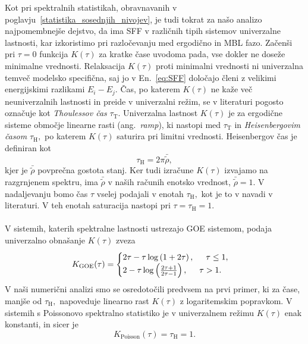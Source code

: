 Kot pri spektralnih statistikah, obravnavanih v poglavju~\ref{statistika_sosednjih_nivojev}, je tudi tokrat za našo analizo najpomembnejše dejstvo, da ima SFF v različnih tipih sistemov univerzalne lastnosti, kar izkoristimo pri razločevanju med ergodično in MBL fazo. Začenši pri $\tau=0$ funkcija $K(\tau)$ za kratke čase uvodoma pada, vse dokler ne doseže minimalne vrednosti. Relaksacija $K(\tau)$ proti minimalni vrednosti ni univerzalna temveč modelsko specifična, saj jo v En.~\eqref{eq:SFF} določajo členi z velikimi energijskimi razlikami $E_i-E_j.$ Čas, po katerem $K(\tau)$ ne kaže več neuniverzalnih lastnosti in preide v univerzalni režim, se v literaturi pogosto označuje kot \emph{Thoulessov čas} $\tau_\mathrm{T}.$ Univerzalna lastnost $K(\tau)$ je  za ergodične sisteme območje linearne rasti (ang.~\emph{ramp}), ki nastopi med $\tau_\mathrm{T}$ in \emph{Heisenbergovim časom} $\tau_\mathrm{H},$ po katerem $K(\tau)$ saturira pri limitni vrednosti. Heisenbergov čas je definiran kot
\begin{equation}
\tau_\mathrm{H}=2\pi\bar{\tilde{\rho}},
\end{equation}
kjer je $\bar{\tilde{\rho}}$ povprečna gostota stanj. Ker tudi izračune $K(\tau)$ izvajamo na razgrnjenem spektru, ima $\bar{\tilde{\rho}}$ v naših računih enotsko vrednost, $\bar{\tilde{\rho}}=1.$ V nadaljevanju bomo čas $\tau$ vselej podajali v enotah $\tau_\mathrm{H},$ kot je to v navadi v literaturi. V teh enotah saturacija nastopi pri $\tau=\tau_\mathrm{H}=1.$\\\\
V sistemih, katerih spektralne lastnosti ustrezajo GOE sistemom, podaja univerzalno obnašanje $K(\tau)$ zveza~\cite{sieber2001correlations}
\begin{equation}\label{eq:ramp}
K_\mathrm{GOE}(\tau)=
\begin{cases}
2\tau - \tau \log\left(1 + 2\tau\right), \hspace{5mm} \tau \leq 1, \\
2 - \tau \log\left(\frac{2\tau + 1}{2\tau - 1}\right),\hspace{5mm} \tau >1.
\end{cases}
\end{equation} 
V naši numerični analizi smo se osredotočili predvsem na prvi primer, ki za čase, manjše od $\tau_\mathrm{H},$ napoveduje linearno rast $K(\tau)$ z logaritemskim popravkom. V sistemih s Poissonovo spektralno statistiko je v univerzalnem režimu $K(\tau)$ enak konstanti, in sicer je~\cite{kos2018many}
\begin{equation}
K_\mathrm{Poisson}(\tau)=\tau_\mathrm{H}=1.
\end{equation}
